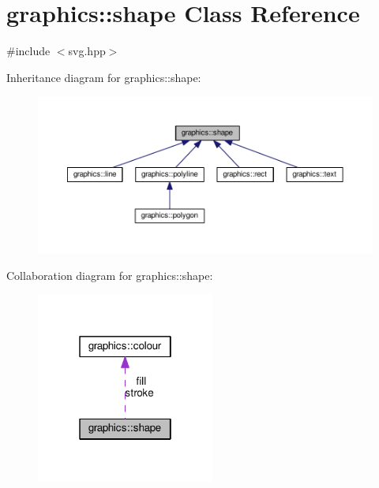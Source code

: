 \hypertarget{classgraphics_1_1shape}{}\section{graphics\+:\+:shape Class Reference}
\label{classgraphics_1_1shape}


{\ttfamily \#include $<$svg.\+hpp$>$}



Inheritance diagram for graphics\+:\+:shape\+:
\nopagebreak
\begin{figure}[H]
\begin{center}
\leavevmode
\includegraphics[width=350pt]{classgraphics_1_1shape__inherit__graph}
\end{center}
\end{figure}


Collaboration diagram for graphics\+:\+:shape\+:
\nopagebreak
\begin{figure}[H]
\begin{center}
\leavevmode
\includegraphics[width=166pt]{classgraphics_1_1shape__coll__graph}
\end{center}
\end{figure}
